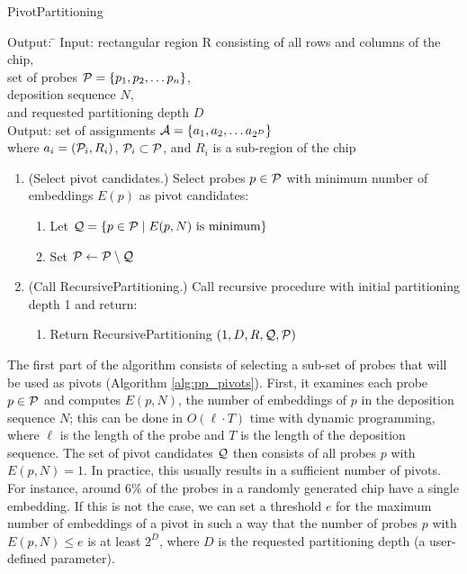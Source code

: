 \begin{algorithm}[t!]
\caption{PivotPartitioning}
\label{alg:pp_pivots}
\begin{minipage}{\textwidth}\footnotesize{
\begin{tabbing}
Output: \= \kill
Input:  \> rectangular region R consisting of all rows and columns of the chip, \\
        \> set of probes ${\mathcal{P}} = \{p_{1}, p_{2}, \dots p_{n}\}$, \\
        \> deposition sequence $N$, \\
        \> and requested partitioning depth $D$ \\
Output: \> set of assignments ${\mathcal{A}} = \{a_1, a_2, \dots a_{2^D}\}$ \\
        \> where $a_i = ({\mathcal{P}}_i, R_i)$, ${\mathcal{P}}_i \subset {\mathcal{P}}$,
           and $R_i$ is a sub-region of the chip
\end{tabbing}
\begin{enumerate}
\item (Select pivot candidates.) Select probes $p \in {\mathcal{P}}$ with minimum number
      of embeddings $E(p)$ as pivot candidates:
  \begin{enumerate}
    \item Let ${\mathcal{Q}} = \{p \in {\mathcal{P}} \;|\; E(p,N) \mbox{ is minimum}\}$
    \item Set ${\mathcal{P}} \leftarrow {\mathcal{P}} \setminus {\mathcal{Q}}$
  \end{enumerate}
\item (Call RecursivePartitioning.) Call recursive procedure with initial
      partitioning depth 1 and return:
  \begin{enumerate}
    \item Return RecursivePartitioning $(1, D, R, {\mathcal{Q}}, {\mathcal{P}})$
  \end{enumerate}
\end{enumerate}
}\end{minipage}
\end{algorithm}

The first part of the algorithm consists of selecting a sub-set of probes that
will be used as pivots (Algorithm \ref{alg:pp_pivots}). First, it examines each
probe $p \in {\mathcal{P}}$ and computes $E(p,N)$, the number of embeddings of $p$ in
the deposition sequence $N$; this can be done in $O(\ell \cdot T)$ time with
dynamic programming, where $\ell$ is the length of the probe and $T$ is the
length of the deposition sequence. The set of pivot candidates ${\mathcal{Q}}$ then
consists of all probes $p$ with $E(p,N)=1$. In practice, this usually results in
a sufficient number of pivots. For instance, around $6\%$ of the probes in a
randomly generated chip have a single embedding. If this is not the case, we can
set a threshold $e$ for the maximum number of embeddings of a pivot in such a
way that the number of probes $p$ with $E(p,N)\leq e$ is at least $2^D$,
where $D$ is the requested partitioning depth (a user-defined parameter).

